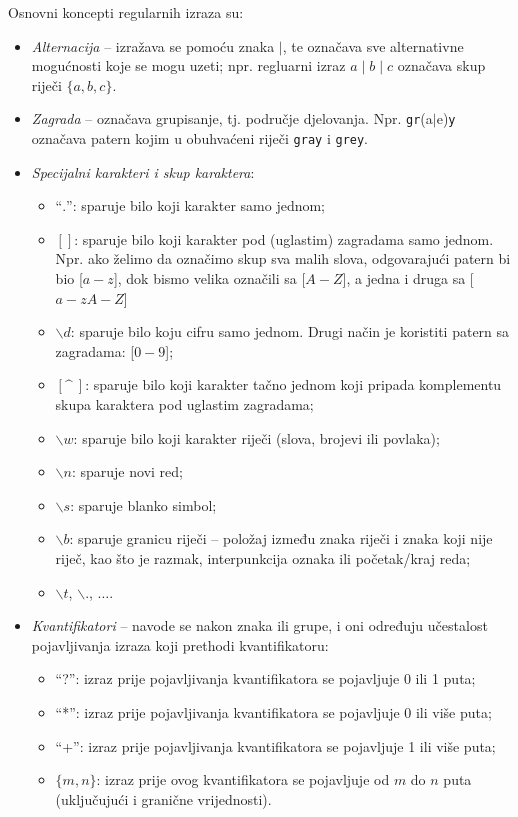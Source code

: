Osnovni koncepti regularnih izraza su:
\begin{itemize}
	\item \textit{Alternacija} -- izražava se pomoću znaka $\mid$, te označava sve alternativne mogućnosti koje se mogu uzeti; npr. regluarni izraz $a\mid b\mid c$ označava skup riječi $\{a, b, c\}$.  
	\item \textit{Zagrada} -- označava grupisanje, tj. područje djelovanja. Npr. \texttt{gr}(a$\mid$e)\texttt{y} označava patern kojim u obuhvaćeni riječi \texttt{gray} i \texttt{grey}.
    \item \textit{Specijalni karakteri i skup karaktera}:
    \begin{itemize}
    	\item ``$.$'': sparuje bilo koji karakter samo jednom; 
    	\item $[]$: sparuje bilo koji karakter pod (uglastim) zagradama samo jednom. Npr. ako želimo da označimo skup sva malih slova, odgovarajući patern bi bio [$a-z$], dok bismo velika označili sa [$A-Z$], a jedna i druga sa [$a-zA-Z$]
    	\item $\backslash d$: sparuje bilo koju cifru samo jednom. Drugi način je koristiti patern sa zagradama: [$0-9$];
    	\item $[\^ \   ]$: sparuje bilo koji karakter tačno jednom koji pripada komplementu skupa karaktera pod
    	uglastim zagradama; 
    	\item $\backslash w$: sparuje bilo koji karakter riječi (slova, brojevi ili povlaka); 
    	\item $\backslash n$: sparuje novi red;
    	\item $\backslash s$: sparuje blanko simbol; 
    	\item $\backslash b$: sparuje granicu riječi -- položaj između znaka riječi i znaka koji nije riječ, kao što je razmak, interpunkcija oznaka ili početak/kraj reda;
    	\item $\backslash t$, $\backslash .$, $\ldots$.
    \end{itemize}
	\item  \textit{Kvantifikatori} -- navode se nakon znaka ili grupe, i oni određuju  učestalost
pojavljivanja izraza koji prethodi kvantifikatoru:
\begin{itemize}
	\item ``?'': izraz prije pojavljivanja kvantifikatora se pojavljuje 0 ili 1 puta; %
	\item ``*'': izraz prije pojavljivanja kvantifikatora se pojavljuje 0 ili više puta;
	\item  ``+'': izraz prije pojavljivanja kvantifikatora se pojavljuje  1 ili više puta;
	\item $\{m,n\}$: izraz prije ovog kvantifikatora se pojavljuje od $m$ do $n$ puta (uključujući i granične vrijednosti).
\end{itemize}
\end{itemize}


